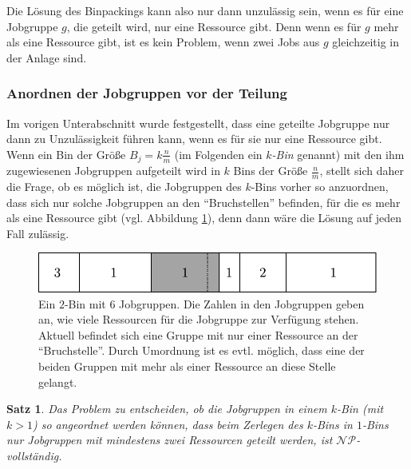 \documentclass{scrreprt}
\newtheorem{satz}{Satz}
\begin{document}
Die Lösung des Binpackings kann also nur dann unzulässig sein, wenn es für eine Jobgruppe $g$, die geteilt wird, nur eine Ressource gibt.
Denn wenn es für $g$ mehr als eine Ressource gibt, ist es kein Problem, wenn zwei Jobs aus $g$ gleichzeitig in der Anlage sind.

\subsubsection{Anordnen der Jobgruppen vor der Teilung}
Im vorigen Unterabschnitt wurde festgestellt, dass eine geteilte Jobgruppe nur dann
zu Unzulässigkeit führen kann, wenn es für sie nur eine Ressource gibt.
Wenn ein Bin der Größe $B_j = k\frac{n}{m}$ (im Folgenden ein $k$\textit{-Bin} genannt) 
mit den ihm zugewiesenen Jobgruppen aufgeteilt wird in $k$ Bins der Größe $\frac{n}{m}$, 
stellt sich daher die Frage, ob es möglich ist, die Jobgruppen des $k$-Bins vorher so anzuordnen, dass sich nur solche Jobgruppen an den "`Bruchstellen"' befinden, 
für die es mehr als eine Ressource gibt (vgl. Abbildung \ref{abb:resnp}), denn dann wäre die Lösung auf jeden Fall zulässig.
\begin{figure}
    \begin{center}
        \includegraphics[width=.8\textwidth]{graphics/resnp.pdf}
    \end{center}
    \caption{
        \label{abb:resnp}
        Ein $2$-Bin mit $6$ Jobgruppen. Die Zahlen in den Jobgruppen geben an, wie viele Ressourcen für die Jobgruppe zur Verfügung stehen.
        Aktuell befindet sich eine Gruppe mit nur einer Ressource an der "`Bruchstelle"'.
        Durch Umordnung ist es evtl. möglich, dass eine der beiden Gruppen mit mehr als einer Ressource an diese Stelle gelangt.
    }
\end{figure}
\begin{satz}
    Das Problem zu entscheiden, ob die Jobgruppen in einem $k$-Bin (mit $k>1$) so angeordnet werden können,
    dass beim Zerlegen des $k$-Bins in $1$-Bins nur Jobgruppen mit mindestens zwei Ressourcen geteilt werden, ist $\mathcal{NP}$-vollständig.
\end{satz}
\end{document}
